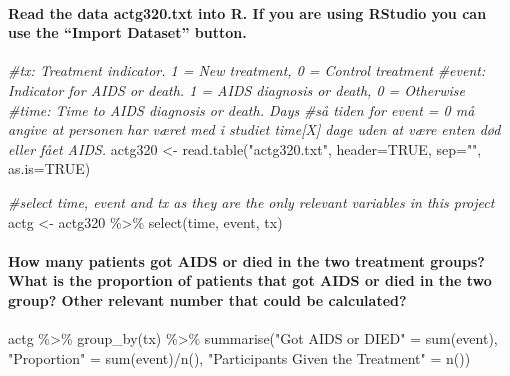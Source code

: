 \documentclass[
]{article}
\newenvironment{Shaded}{\begin{snugshade}}{\end{snugshade}}
\newcommand{\AttributeTok}[1]{\textcolor[rgb]{0.77,0.63,0.00}{#1}}
\newcommand{\CommentTok}[1]{\textcolor[rgb]{0.56,0.35,0.01}{\textit{#1}}}
\newcommand{\ConstantTok}[1]{\textcolor[rgb]{0.00,0.00,0.00}{#1}}
\newcommand{\FunctionTok}[1]{\textcolor[rgb]{0.00,0.00,0.00}{#1}}
\newcommand{\NormalTok}[1]{#1}
\newcommand{\OtherTok}[1]{\textcolor[rgb]{0.56,0.35,0.01}{#1}}
\newcommand{\SpecialCharTok}[1]{\textcolor[rgb]{0.00,0.00,0.00}{#1}}
\newcommand{\StringTok}[1]{\textcolor[rgb]{0.31,0.60,0.02}{#1}}
\begin{document}
\hypertarget{read-the-data-actg320.txt-into-r.-if-you-are-using-rstudio-you-can-use-the-import-dataset-button.}{%
\paragraph{Read the data actg320.txt into R. If you are using RStudio
you can use the ``Import Dataset''
button.}\label{read-the-data-actg320.txt-into-r.-if-you-are-using-rstudio-you-can-use-the-import-dataset-button.}}

\begin{Shaded}
\begin{Highlighting}[]
\CommentTok{\#tx: Treatment indicator. 1 = New treatment, 0 = Control treatment}
\CommentTok{\#event: Indicator for AIDS or death. 1 = AIDS diagnosis or death, 0 = Otherwise}
\CommentTok{\#time: Time to AIDS diagnosis or death. Days}
\CommentTok{\#så tiden for event = 0 må angive at personen har været med i studiet time[X] dage uden at være enten død eller fået AIDS.}
\NormalTok{actg320 }\OtherTok{\textless{}{-}} \FunctionTok{read.table}\NormalTok{(}\StringTok{"actg320.txt"}\NormalTok{, }\AttributeTok{header=}\ConstantTok{TRUE}\NormalTok{, }\AttributeTok{sep=}\StringTok{""}\NormalTok{, }
                      \AttributeTok{as.is=}\ConstantTok{TRUE}\NormalTok{)}

\CommentTok{\#select time, event and tx as they are the only relevant variables in this project}
\NormalTok{actg }\OtherTok{\textless{}{-}}\NormalTok{ actg320 }\SpecialCharTok{\%\textgreater{}\%}
  \FunctionTok{select}\NormalTok{(time, event, tx)}
\end{Highlighting}
\end{Shaded}

\hypertarget{how-many-patients-got-aids-or-died-in-the-two-treatment-groups-what-is-the-proportion-of-patients-that-got-aids-or-died-in-the-two-group-other-relevant-number-that-could-be-calculated}{%
\paragraph{How many patients got AIDS or died in the two treatment
groups? What is the proportion of patients that got AIDS or died in the
two group? Other relevant number that could be
calculated?}\label{how-many-patients-got-aids-or-died-in-the-two-treatment-groups-what-is-the-proportion-of-patients-that-got-aids-or-died-in-the-two-group-other-relevant-number-that-could-be-calculated}}

\begin{Shaded}
\begin{Highlighting}[]
\NormalTok{actg }\SpecialCharTok{\%\textgreater{}\%}
  \FunctionTok{group\_by}\NormalTok{(tx) }\SpecialCharTok{\%\textgreater{}\%}
  \FunctionTok{summarise}\NormalTok{(}\StringTok{"Got AIDS or DIED"} \OtherTok{=} \FunctionTok{sum}\NormalTok{(event),}
            \StringTok{"Proportion"} \OtherTok{=} \FunctionTok{sum}\NormalTok{(event)}\SpecialCharTok{/}\FunctionTok{n}\NormalTok{(),}
            \StringTok{"Participants Given the Treatment"} \OtherTok{=} \FunctionTok{n}\NormalTok{())}
\end{Highlighting}
\end{Shaded}
\end{document}
